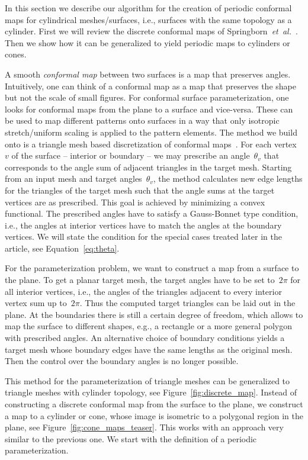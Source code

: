 \documentclass[Thesis.tex]{subfiles}
\begin{document}
In this section we describe our algorithm for the creation of periodic
conformal maps for cylindrical meshes/surfaces, i.e., surfaces with
the same topology as a cylinder. First we will review the discrete
conformal maps of Springborn~\emph{et~al.}~\cite{Springborn2008}. Then we show how it can be generalized
to yield periodic maps to cylinders or cones.

A smooth \emph{conformal map} between two surfaces is a map that
preserves angles. Intuitively, one can think of a conformal map as a
map that preserves the shape but not the scale of small figures. For
conformal surface parameterization, one looks for conformal
maps from the plane to a surface and vice-versa. These can be used to 
map different patterns onto surfaces in a way that only isotropic
stretch/uniform scaling is applied to the pattern elements.
%
The method we build onto is a triangle mesh based
discretization of conformal maps~\cite{Springborn2008}. For each vertex~$v$ of
the surface -- interior or boundary -- we may prescribe an
angle~$\theta_v$ that corresponds to the angle sum of adjacent
triangles in the target mesh.  Starting from an input mesh and target
angles~$\theta_v$, the method calculates new edge lengths for the
triangles of the target mesh such that the angle sums at the target
vertices are as prescribed. This goal is achieved by minimizing a
convex functional.  
%
The prescribed angles have to satisfy a Gauss-Bonnet type condition,
i.e., the angles at interior vertices have to match the angles at the
boundary vertices.  We will state the condition for the special cases
treated later in the article, see Equation~\eqref{eq:theta}.

For the parameterization problem, we want to construct a map from a
surface to the plane. To get a planar target mesh, the target angles
have to be set to~$2\pi$ for all interior vertices, i.e., the angles
of the triangles adjacent to every interior vertex sum up
to~$2\pi$. Thus the computed target triangles can be laid out in the
plane. At the boundaries there is still a certain degree of freedom,
which allows to map the surface to different shapes, e.g., a rectangle
or a more general polygon with prescribed angles. 
%
An alternative choice of boundary conditions yields a target mesh
whose boundary edges have the same lengths as the original mesh. Then
the control over the boundary angles is no longer possible.

This method for the parameterization of triangle meshes can be generalized
to triangle meshes with cylinder topology, see Figure~\ref{fig:discrete_map}. 
Instead of constructing a discrete conformal map from the
surface to the plane, we construct a map to a cylinder or cone, whose image
is isometric to a polygonal region in the plane, see Figure~\ref{fig:cone_maps_teaser}. 
This works with an approach very similar to the previous one. We start 
with the definition of a periodic parameterization.
\end{document}
